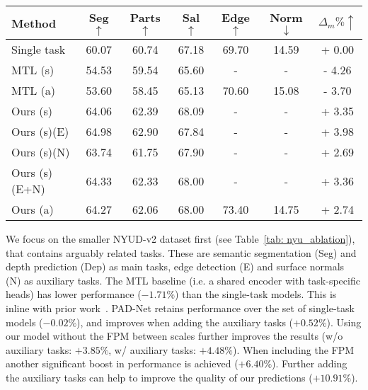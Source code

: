 \documentclass[runningheads]{llncs}
\begin{document}
\begin{table}[t]
\begin{subtable}[t]{0.45\linewidth}
{\begin{tabular}{|l|c|c|c|c|c|c|}
    Method & Seg $\uparrow$ & Parts $\uparrow$ & Sal $\uparrow$ & Edge $\uparrow$ & Norm $\downarrow$ & $\Delta_{m} \% \uparrow$ \\
    \hline
    Single task & 60.07 & 60.74 & 67.18 & 69.70 & 14.59 & + 0.00 \\
    MTL (s) & 54.53 & 59.54 & 65.60 & - & - & - 4.26 \\
    MTL (a) & 53.60 & 58.45 & 65.13 & 70.60 & 15.08 & - 3.70 \\
    \hline
    Ours (s) & 64.06 & 62.39 & 68.09 & - & - & + 3.35 \\
    Ours (s)(E) & 64.98 & 62.90 & 67.84 & - & - & + 3.98 \\
    Ours (s)(N) & 63.74 & 61.75 & 67.90 & - & - & + 2.69 \\
    Ours (s)(E+N) & 64.33 & 62.33 & 68.00 & - & - & + 3.36 \\
    Ours (a) & 64.27 & 62.06 & 68.00 & 73.40 & 14.75 & + 2.74 \\
    \hline
    \end{tabular}}
    \end{subtable}\end{table}

We focus on the smaller NYUD-v2 dataset first (see Table~\ref{tab: nyu_ablation}), that contains arguably related tasks. These are semantic segmentation (Seg) and depth prediction (Dep) as main tasks, edge detection (E) and surface normals (N) as auxiliary tasks. The MTL baseline (i.e. a shared encoder with task-specific heads) has lower performance ($-1.71\%$) than the single-task models. This is inline with prior work~\cite{vandenhende2019branched,maninis2019attentive}. PAD-Net retains performance over the set of single-task models ($-0.02\%$), and improves when adding the auxiliary tasks ($+0.52\%$). Using our model without the FPM between scales further improves the results (w/o auxiliary tasks: $+3.85\%$, w/ auxiliary tasks: $+4.48\%$). When including the FPM another significant boost in performance is achieved ($+6.40\%$). Further adding the auxiliary tasks can help to improve the quality of our predictions ($+10.91\%$).
\end{document}
